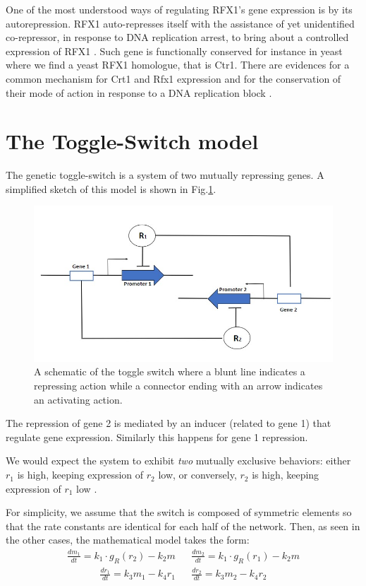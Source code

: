 \documentclass[12pt,a4paper]{report}
\begin{document}
One of the most understood ways of regulating RFX1's gene expression is by its autorepression. RFX1 auto-represses itself with the assistance of yet unidentified co-repressor, in response to DNA replication arrest, to bring about a controlled expression of RFX1 \cite{RFX1ArsenalAgainstCancer}. Such gene is functionally conserved for instance in yeast where we find a yeast RFX1 homologue, that is Ctr1. There are evidences for a common mechanism for Crt1 and Rfx1 expression and for the conservation of their mode of action in response to a DNA replication block \cite{RFX1genehumansyeast}.




\section{The Toggle-Switch model}
The genetic toggle-switch is a system of two mutually repressing genes. A simplified sketch of this model is shown in Fig.\ref{toggleswitch}.

\begin{figure}[!ht]
\centering
\includegraphics[scale=0.75]{toggleswitch.jpg}
\caption{A schematic of the toggle switch where a blunt line indicates a repressing action while a connector ending with an arrow indicates an activating action.}
\label{toggleswitch}
\end{figure}

The repression of gene 2 is mediated by an inducer (related to gene 1) that regulate gene expression. Similarly this happens for gene 1 repression.

We would expect the system to exhibit \emph{two} mutually exclusive behaviors: either $r_{1}$ is high, keeping expression of $r_{2}$ low, or conversely, $r_{2}$ is high, keeping expression of $r_{1}$ low \cite{SanDiegoUniversity}. 

For simplicity, we assume that the switch is composed of symmetric elements so that the rate constants are identical for each half of the network. Then, as seen in the other cases, the mathematical model takes the form:
\begin{align}
 \frac{dm_{1}}{dt}=k_{1}\cdot g_{R}(r_{2}) - k_{2}m && \frac{dm_{2}}{dt} = k_{1} \cdot g_{R}(r_{1}) - k_{2}m
\end{align}
\begin{align}
 \frac{dr_{1}}{dt}=k_{3}m_{1} - k_{4}r_{1} && \frac{dr_{2}}{dt} = k_{3}m_{2} - k_{4}r_{2}
\end{align}
\end{document}
